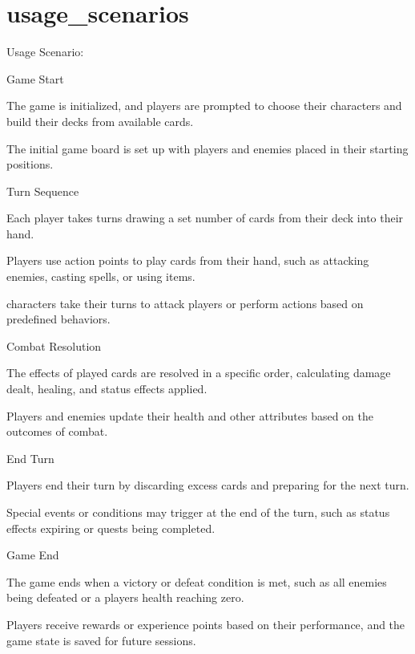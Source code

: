 \chapter{usage\+\_\+scenarios}
\hypertarget{md_docs_2architecture_2usage__scenarios}{}\label{md_docs_2architecture_2usage__scenarios}
Usage Scenario\+:


\begin{DoxyEnumerate}
\item Game Start
\begin{DoxyItemize}
\item The game is initialized, and players are prompted to choose their characters and build their decks from available cards.
\item The initial game board is set up with players and enemies placed in their starting positions.
\end{DoxyItemize}
\item Turn Sequence
\begin{DoxyItemize}
\item Each player takes turns drawing a set number of cards from their deck into their hand.
\item Players use action points to play cards from their hand, such as attacking enemies, casting spells, or using items.
\item {} characters take their turns to attack players or perform actions based on predefined behaviors.
\end{DoxyItemize}
\item Combat Resolution
\begin{DoxyItemize}
\item The effects of played cards are resolved in a specific order, calculating damage dealt, healing, and status effects applied.
\item Players and enemies update their health and other attributes based on the outcomes of combat.
\end{DoxyItemize}
\item End Turn
\begin{DoxyItemize}
\item Players end their turn by discarding excess cards and preparing for the next turn.
\item Special events or conditions may trigger at the end of the turn, such as status effects expiring or quests being completed.
\end{DoxyItemize}
\item Game End
\begin{DoxyItemize}
\item The game ends when a victory or defeat condition is met, such as all enemies being defeated or a player\textquotesingle{}s health reaching zero.
\item Players receive rewards or experience points based on their performance, and the game state is saved for future sessions. 
\end{DoxyItemize}
\end{DoxyEnumerate}